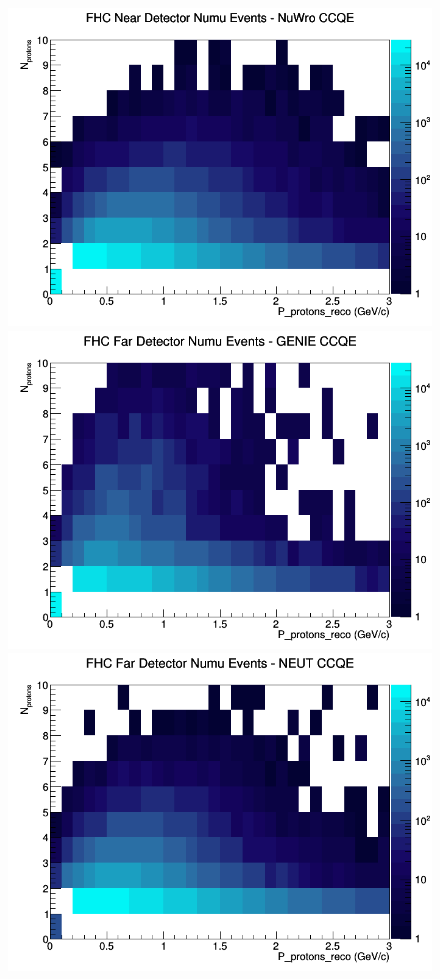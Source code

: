 \documentclass[12pt]{article}
\begin{document}
\begin{figure}[h]
\includegraphics[width=\linewidth]{eff_N_P/LAr/protons/CCQE_FHC_ND_numu_N_P_NuWro.png}
\endminipage
\newline
{}
\includegraphics[width=\linewidth]{eff_N_P/LAr/protons/CCQE_FHC_FD_numu_N_P_GENIE.png}
\endminipage
{}
\includegraphics[width=\linewidth]{eff_N_P/LAr/protons/CCQE_FHC_FD_numu_N_P_NEUT.png}

\end{figure}
\end{document}
